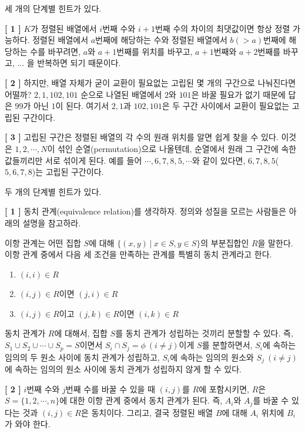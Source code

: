 \begin{hint}
    세 개의 단계별 힌트가 있다.

    \textbf{[ 1 ]} \newline
    $K$가 정렬된 배열에서 $i$번째 수와 $i+1$번째 수의 차이의 최댓값이면 항상 정렬 가능하다. 정렬된 배열에서 $a$번째에 해당하는 수와 정렬된 배열에서 $b(>a)$번째에 해당하는 수를 바꾸려면, $a$와 $a+1$번째를 위치를 바꾸고, $a+1$번째와 $a+2$번째를 바꾸고, ... 을 반복하면 되기 때문이다.

    \textbf{[ 2 ]} \newline
    하지만, 배열 자체가 굳이 교환이 필요없는 고립된 몇 개의 구간으로 나눠진다면 어떨까? $2, 1, 102, 101$ 순으로 나열된 배열에서 $2$와 $101$은 바꿀 필요가 없기 때문에 답은 $99$가 아닌 $1$이 된다. 여기서 $2, 1$과 $102, 101$은 두 구간 사이에서 교환이 필요없는 고립된 구간이다.

    \textbf{[ 3 ]} \newline
    고립된 구간은 정렬된 배열의 각 수의 원래 위치를 알면 쉽게 찾을 수 있다. 이것은 $1, 2, \cdots, N$이 섞인 순열(permutation)으로 나올텐데, 순열에서 원래 그 구간에 속한 값들끼리만 서로 섞이게 된다. 예를 들어 $\cdots, 6, 7, 8, 5, \cdots$와 같이 있다면, $6, 7, 8, 5$($5, 6, 7, 8$)는 고립된 구간이다.
\end{hint}

\begin{hint}
    두 개의 단계별 힌트가 있다.

    \textbf{[ 1 ]} \newline
    동치 관계(equivalence relation)를 생각하자. 정의와 성질을 모르는 사람들은 아래의 설명을 참고하라.
    
    이항 관계는 어떤 집합 $S$에 대해 $\{(x, y)~|~x \in S, y \in S\}$의 부분집합인 $R$을 말한다. 이항 관계 중에서 다음 세 조건을 만족하는 관계를 특별히 동치 관계라고 한다.
    \begin{enumerate}
        \item $(i, i) \in R$
        \item $(i, j) \in R$이면 $(j, i) \in R$
        \item $(i, j) \in R$이고 $(j, k) \in R$이면 $(i, k) \in R$
    \end{enumerate}
    동치 관계가 $R$에 대해서, 집합 $S$를 동치 관계가 성립하는 것끼리 분할할 수 있다. 즉, $S_1 \cup S_2 \cup \cdots \cup S_p = S$이면서 $S_i \cap S_j = \phi ~ (i \neq j)$이게 $S$를 분할하면서, $S_i$에 속하는 임의의 두 원소 사이에 동치 관계가 성립하고, $S_i$에 속하는 임의의 원소와 $S_j ~ (i \neq j)$에 속하는 임의의 원소 사이에 동치 관계가 성립하지 않게 할 수 있다.

    \textbf{[ 2 ]} \newline
    $i$번째 수와 $j$번째 수를 바꿀 수 있을 때 $(i, j)$를 $R$에 포함시키면, $R$은 $S = \{1, 2, \cdots, n\}$에 대한 이항 관계 중에서 동치 관계가 된다. 즉, $A_i$와 $A_j$를 바꿀 수 있다는 것과 $(i, j) \in R$은 동치이다. 그리고, 결국 정렬된 배열 $B$에 대해 $A_i$ 위치에 $B_i$가 와야 한다.
\end{hint}

